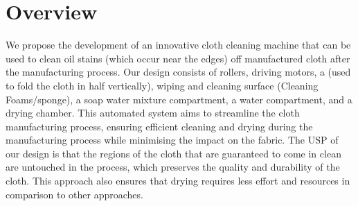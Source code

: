 \documentclass[table,french,english]{rapportCS}
\begin{document}
\section{Overview}
We propose the development of an innovative cloth cleaning machine that can be used to clean oil stains (which occur near the edges) off manufactured cloth after the manufacturing process. Our design consists of rollers, driving motors, a   (used to fold the cloth in half vertically), wiping and cleaning surface (Cleaning Foams/sponge), a soap water mixture compartment, a water compartment, and a drying chamber. This automated system aims to streamline the cloth manufacturing process, ensuring efficient cleaning and drying during the manufacturing process while minimising the impact on the fabric. The USP of our design is that the regions of the cloth that are guaranteed to come in clean are untouched in the process, which preserves the quality and durability of the cloth. This approach also ensures that drying requires less effort and resources in comparison to other approaches.
\end{document}

